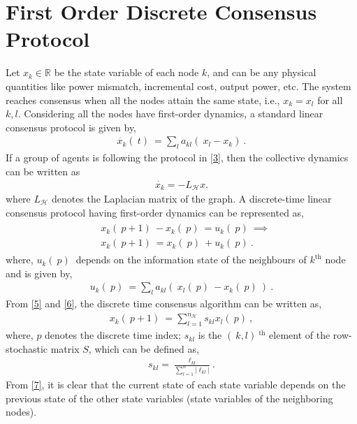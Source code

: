 \section{First Order Discrete Consensus Protocol}
Let $x_k \in \mathbb{R}$ be the state variable of each node $k$, and can be any physical quantities like power mismatch, incremental cost, output power, etc. The system reaches consensus when all the nodes attain the same state, i.e., $x_k = x_l$ for all $k, l$. Considering all the nodes have first-order dynamics, a standard linear consensus protocol \cite{olfati2007consensus} is given by,
\begin{align}\label{3}
    \Dot{x_k}(\ \! t )\ = \sum\limits_{l} a_{kl} (\ \! x_l - x_k)\ .
\end{align}
If a group of agents is following the protocol in \eqref{3}, then the collective dynamics can be written as
\begin{align}\label{4}
    \Dot{x_k} = -L_{\mathcal{H}}x.
\end{align}
where $L_\mathcal{H}$ denotes the Laplacian matrix of the graph. A discrete-time linear consensus protocol \cite{olfati2007consensus} having first-order dynamics can be represented as,
\begin{align}\label{5}
\begin{split}
    & x_k (\ \! p+1)\ \! - x_k (\ \! p)\ \! = u_k (\ \! p)\ \implies \\
    & x_k (\ \! p+1)\ \! = x_k (\ \! p)\ \! + u_k (\ \! p)\ .
\end{split}
\end{align}
where, $u_k (\ p)\ \!$ depends on the information state of the neighbours of $k^{\text{th}}$ node and is given by,
\begin{align}\label{6}
    u_k (\ \! p)\ \! = \sum\limits_{l} a_{kl} (\ \! x_l(\ \! p)\ \! - x_k(\ \! p)\ \!)\ .
\end{align}
From \eqref{5} and \eqref{6}, the discrete time consensus algorithm can be written as,
\begin{align}\label{7}
    x_k (\ \! p+1)\ \! = \sum\limits_{l=1}^{n_\mathcal{H}} s_{kl} x_l(\ \! p)\ \!,
\end{align}
where, $p$ denotes the discrete time index; $s_{kl}$ is the $(\ \! k,l)\ \!^\text{th} $ element of the row-stochastic matrix $S$, which can be defined as,
\begin{align}\label{8}
    s_{kl} = \frac{\ell_{kl}}{\sum\limits_{l=1}^{n}|\ell_{kl}|}. 
\end{align}
From \eqref{7}, it is clear that the current state of each state variable depends on the previous state of the other state variables (state variables of the neighboring nodes).